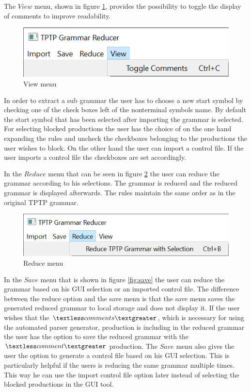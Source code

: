 The $View$ menu, shown in figure \ref{fig:view}, provides the possibility to toggle the display of comments to improve readability.

\begin{figure}[H]
\centering
\includegraphics[width=1\textwidth]{images/view.png}
\caption{View menu}
\label{fig:view}
\end{figure}

In order to extract a sub grammar the user has to choose a new start symbol by checking one of the check boxes left of the nonterminal symbols name. By default the start symbol that has been selected after importing the grammar is selected. For selecting blocked productions the user has the choice of on the one hand expanding the rules and uncheck the checkboxes belonging to the productions the user wishes to block. On the other hand the user can import a control file. If the user imports a control file the checkboxes are set accordingly.

In the $Reduce$ menu that can be seen in figure \ref{fig:reduce} the user can reduce the grammar according to his selections. The grammar is reduced and the reduced grammar is displayed afterwards. The rules maintain the same order as in the original TPTP grammar.

\begin{figure}[H]
\centering
\includegraphics[width=1\textwidth]{images/reduce.png}
\caption{Reduce menu}
\label{fig:reduce}
\end{figure}

In the $Save$ menu that is shown in figure \ref{fig:save} the user can reduce the grammar based on his GUI selection or an imported control file. The difference between the reduce option and the save menu is that the save menu saves the generated reduced grammar to local storage and does not display it. If the user wishes that the $\textless comments\textgreater$, which is necessary for using the automated parser generator, production is including in the reduced grammar the user has the option to save the reduced grammar with the $\textless comment\textgreater$ production.
The $Save$ menu also gives the user the option to generate a control file based on his GUI selection. This is particularly helpful if the users is reducing the same grammar multiple times. This way he can use the import control file option later instead of selecting the blocked productions in the GUI tool.

